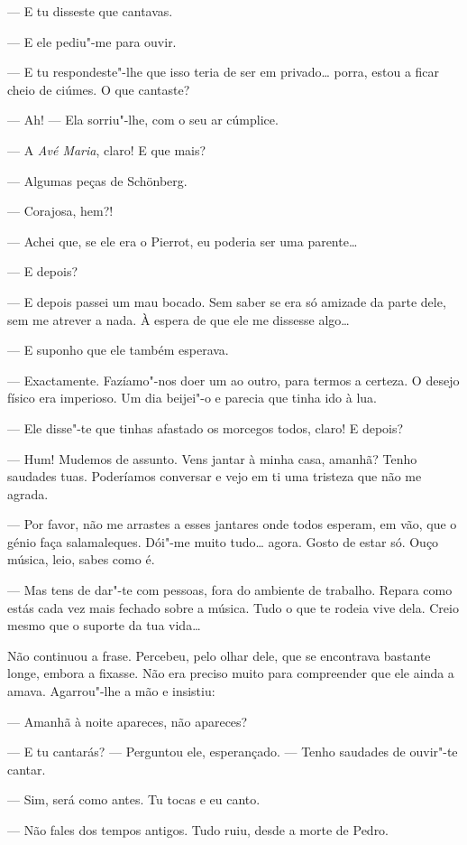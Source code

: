 --- E tu disseste que cantavas.

--- E ele pediu"-me para ouvir.

--- E tu respondeste"-lhe que isso teria de ser em privado\ldots{} porra, estou a
ficar cheio de ciúmes. O que cantaste?

--- Ah! --- Ela sorriu"-lhe, com o seu ar cúmplice.

--- A \emph{Avé Maria}, claro! E que mais?

--- Algumas peças de Schönberg.

--- Corajosa, hem?!

--- Achei que, se ele era o Pierrot, eu poderia ser uma parente\ldots{}

--- E depois?

--- E depois passei um mau bocado. Sem saber se era só amizade da parte
dele, sem me atrever a nada. À espera de que ele me dissesse algo\ldots{}

--- E suponho que ele também esperava.

--- Exactamente. Fazíamo"-nos doer um ao outro, para termos a certeza. O
desejo físico era imperioso. Um dia beijei"-o e parecia que tinha ido à
lua.

--- Ele disse"-te que tinhas afastado os morcegos todos, claro! E depois?

--- Hum! Mudemos de assunto. Vens jantar à minha casa, amanhã? Tenho
saudades tuas. Poderíamos conversar e vejo em ti uma tristeza que não me
agrada.

--- Por favor, não me arrastes a esses jantares onde todos esperam, em
vão, que o génio faça salamaleques. Dói"-me muito tudo\ldots{} agora. Gosto de
estar só. Ouço música, leio, sabes como é.

--- Mas tens de dar"-te com pessoas, fora do ambiente de trabalho. Repara
como estás cada vez mais fechado sobre a música. Tudo o que te rodeia
vive dela. Creio mesmo que o suporte da tua vida\ldots{}

Não continuou a frase. Percebeu, pelo olhar dele, que se encontrava
bastante longe, embora a fixasse. Não era preciso muito para compreender
que ele ainda a amava. Agarrou"-lhe a mão e insistiu:

--- Amanhã à noite apareces, não apareces?

--- E tu cantarás? --- Perguntou ele, esperançado. --- Tenho saudades de
ouvir"-te cantar.

--- Sim, será como antes. Tu tocas e eu canto.

--- Não fales dos tempos antigos. Tudo ruiu, desde a morte de Pedro.

